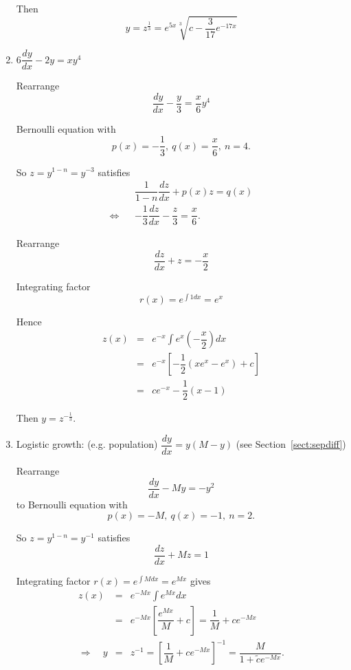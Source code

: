 \begin{examples}
\begin{enumerate}
 Then \[
y=z^{\frac{1}{3}}=e^{5x}\sqrt[3]{c-\dfrac{3}{17} e^{-17x} }
\]


\item
 $6\dfrac{dy}{dx} - 2y = xy^{4}$
 
 Rearrange
 \[
  \dfrac{dy}{dx} - \dfrac{y}{3} = \dfrac{x}{6}y^{4}
 \]

 Bernoulli equation with $$p(x)=-\dfrac{1}{3},\ q(x)=\dfrac{x}{6},\ n=4.$$
 
So $z=y^{1-n}=y^{-3}$ satisfies
\begin{eqnarray*}
&& \dfrac{1}{1-n} \dfrac{dz}{dx} + p(x) z= q(x)\\
\iff&&
  -\dfrac{1}{3} \dfrac{dz}{dx} - \dfrac{z}{3} = \dfrac{x}{6}.
\end{eqnarray*}


Rearrange
 \[
  \dfrac{dz}{dx} + z = -\dfrac{x}{2}
 \]

Integrating factor
\[
 r(x) = e^{\int 1 dx} = e^{x}
\]

Hence
\begin{eqnarray*}
 z(x) &=& e^{-x} \int e^{x} \left(-\dfrac{x}{2}\right) dx\\
 &=& e^{-x}  \left[-\dfrac{1}{2}(xe^{x}-e^{x}) + c\right]\\
 &=& ce^{-x} - \dfrac{1}{2} (x-1)
\end{eqnarray*}

Then $y=z^{-\frac{1}{3}}$.

\item Logistic growth: (e.g. population)\qquad
 $\dfrac{dy}{dx} =y(M-y)$
\qquad (see Section~\ref{sect:sepdiff})
 
 Rearrange
 \[
  \dfrac{dy}{dx} - My = -y^2
 \]
to Bernoulli equation with $$p(x)=-M,\ q(x)=-1,\ n=2.$$
 
So $z=y^{1-n}=y^{-1}$ satisfies
%
%
 \[
  \dfrac{dz}{dx} + Mz = 1
 \]

Integrating factor
$
 r(x) = e^{\int M dx} = e^{Mx}
$
gives
\begin{eqnarray*}
 z(x) &=& e^{-Mx} \int e^{Mx}  dx\\
 &=& e^{-Mx}  \left[\dfrac{e^{Mx}}M+ c\right]
=%
\dfrac1M+ce^{-Mx}
\\
\Rightarrow
\quad y&=&z^{-1}=\left[\dfrac1M+ce^{-Mx}\right]^{-1}=\dfrac M{1+\tilde ce^{-Mx}}
.
\end{eqnarray*}

\end{enumerate}

\end{examples}

